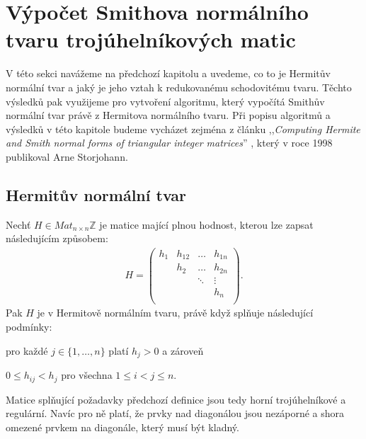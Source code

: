 \chapter{Výpočet Smithova normálního tvaru trojúhelníkových matic}

V této sekci navážeme na předchozí kapitolu a uvedeme, co to je Hermitův normální
tvar a jaký je jeho vztah k redukovanému schodovitému tvaru.
Těchto výsledků pak využijeme pro vytvoření algoritmu, který vypočítá
Smithův normální tvar právě z Hermitova normálního tvaru.
Při popisu algoritmů a výsledků v této kapitole budeme vycházet zejména z článku
,,\textit{Computing Hermite and Smith normal forms of triangular integer matrices}''
\cite{SNF_Arne}, který v roce 1998 publikoval Arne Storjohann.


\section{Hermitův normální tvar}

\begin{defi}\label{hermi}
    Nechť $ H \in Mat_{n \times n}\mathbb{Z} $ je matice mající plnou hodnost,
    kterou lze zapsat následujícím způsobem:
    \begin{align}
        H =
        \begin{pmatrix}
            h_1 & h_{12} & \hdots & h_{1n} \\
                & h_2    & \hdots & h_{2n} \\
                &        & \ddots & \vdots \\
                &        &        & h_n    \\
        \end{pmatrix}.
    \end{align}
    Pak $ H $ je v Hermitově normálním tvaru, právě když splňuje následující
    podmínky:
    \begin{Cond}
        \item pro každé $ j \in \{1,\dots, n\}$ platí $ h_j > 0 $ a zároveň
        \item $ 0 \leq h_{ij} < h_j $ pro všechna $ 1 \leq i < j \leq n $.
    \end{Cond}
\end{defi}
\begin{pozn}
    Matice splňující požadavky předchozí definice jsou tedy horní trojúhelníkové
    a regulární. Navíc pro ně platí, že prvky nad diagonálou jsou nezáporné a
    shora omezené prvkem na diagonále, který musí být kladný.
\end{pozn}

